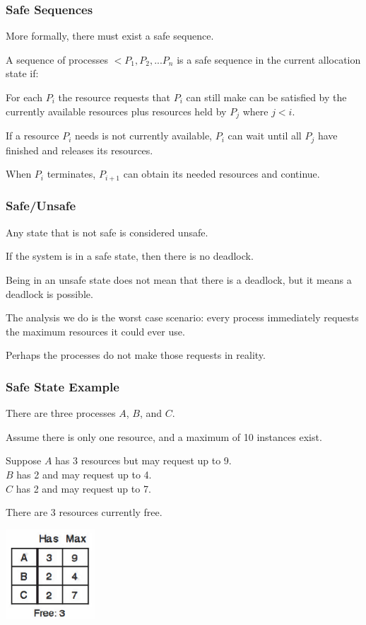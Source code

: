 \begin{frame}
\frametitle{Safe Sequences}

More formally, there must exist a \alert{safe sequence}.

A sequence of processes $<P_{1}, P_{2}, ... P_{n}$ is a safe sequence in the current allocation state if:

For each $P_{i}$ the resource requests that $P_{i}$ can still make can be satisfied by the currently available resources plus resources held by $P_{j}$ where $j < i$. 

If a resource $P_{i}$ needs is not currently available, $P_{i}$ can wait until all $P_{j}$ have finished and releases its resources. 

When $P_{i}$ terminates, $P_{i+1}$ can obtain its needed resources and continue.

\end{frame}

\begin{frame}
\frametitle{Safe/Unsafe}

Any state that is not safe is considered \alert{unsafe}. 

If the system is in a safe state, then there is no deadlock. 

Being in an unsafe state does not mean that there is a deadlock, but it means a deadlock is possible. 

The analysis we do is the worst case scenario: every process immediately requests the maximum resources it could ever use. 

Perhaps the processes do not make those requests in reality.

\end{frame}

\begin{frame}
\frametitle{Safe State Example}

There are three processes $A$, $B$, and $C$. 

Assume there is only one resource, and a maximum of 10 instances exist. 

Suppose $A$ has 3 resources but may request up to 9.\\
$B$ has 2 and may request up to 4.\\
$C$ has 2 and may request up to 7. 

There are 3 resources currently free.

\begin{center}
\includegraphics[width=0.25\textwidth]{images/safe-state-initial.png}
\end{center}

\end{frame}

